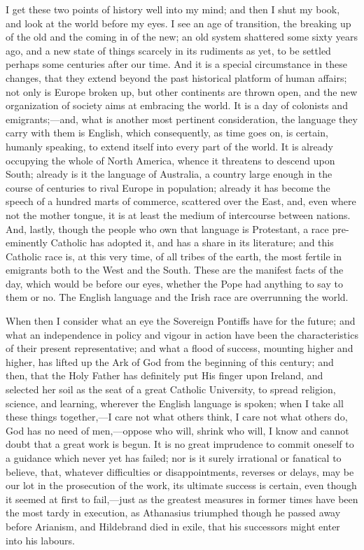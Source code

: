 I get these two points of history well into my mind; and then I
shut my book, and look at the world before my eyes. I see an age of
transition, the breaking up of the old and the coming in of the new;
an old system shattered some sixty years ago, and a new state of
things scarcely in its rudiments as yet, to be settled perhaps some
centuries after our time. And it is a special circumstance in these
changes, that they extend beyond the past historical platform of human
affairs; not only is Europe broken up, but other continents are thrown
open, and the new organization of society aims at embracing the world.
It is a day of colonists and emigrants;—and, what is another most
pertinent consideration, the language they carry with them is English,
which consequently, as time goes on, is certain, humanly speaking, to
extend itself into every part of the world. It is already occupying
the whole of North America, whence it threatens to descend upon South;
already is it the language of Australia, a country large enough
in the course of centuries to rival Europe in population; already it
has become the speech of a hundred marts of commerce, scattered over
the East, and, even where not the mother tongue, it is at least the
medium of intercourse between nations. And, lastly, though the people
who own that language is Protestant, a race pre-eminently Catholic has
adopted it, and has a share in its literature; and this Catholic race
is, at this very time, of all tribes of the earth, the most fertile in
emigrants both to the West and the South. These are the manifest facts
of the day, which would be before our eyes, whether the Pope had
anything to say to them or no. The English language and the Irish race
are overrunning the world.

When then I consider what an eye the Sovereign Pontiffs have for
the future; and what an independence in policy and vigour in action
have been the characteristics of their present representative; and
what a flood of success, mounting higher and higher, has lifted up the
Ark of God from the beginning of this century; and then, that the Holy
Father has definitely put His finger upon Ireland, and selected her
soil as the seat of a great Catholic University, to spread religion,
science, and learning, wherever the English language is spoken; when I
take all these things together,—I care not what others think, I care
not what others do, God has no need of men,—oppose who will, shrink
who will, I know and cannot doubt that a great work is begun. It is no
great imprudence to commit oneself to a guidance which never yet has
failed; nor is it surely irrational or fanatical to believe, that,
whatever difficulties or disappointments, reverses or delays, may be
our lot in the prosecution of the work, its ultimate success is
certain, even though it seemed at first to fail,—just as the
greatest measures in former times have been the most tardy in
execution, as Athanasius triumphed though he passed away before
Arianism, and Hildebrand died in exile, that his successors might
enter into his labours.

